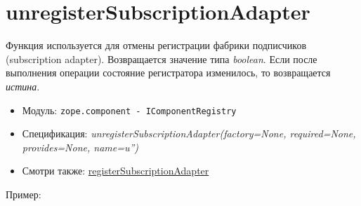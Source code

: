 \documentclass[a4paper,openany,twoside,draft]{book}
\providecommand*{\DUroletitlereference}[1]{\textsl{#1}}
\begin{document}
\section*{unregisterSubscriptionAdapter%
  \label{unregistersubscriptionadapter}%
}

Функция используется для отмены регистрации фабрики подписчиков (subscription adapter).  Возвращается значение типа \DUroletitlereference{boolean}. Если после выполнения операции состояние регистратора изменилось, то возвращается \DUroletitlereference{истина}.

\begin{itemize}

\item Модуль: \texttt{zope.component - IComponentRegistry}

\item Спецификация: \DUroletitlereference{unregisterSubscriptionAdapter(factory=None, required=None, provides=None, name=u'')}

\item Смотри также: \hyperref[registersubscriptionadapter]{registerSubscriptionAdapter}

\end{itemize}

Пример:
\end{document}
